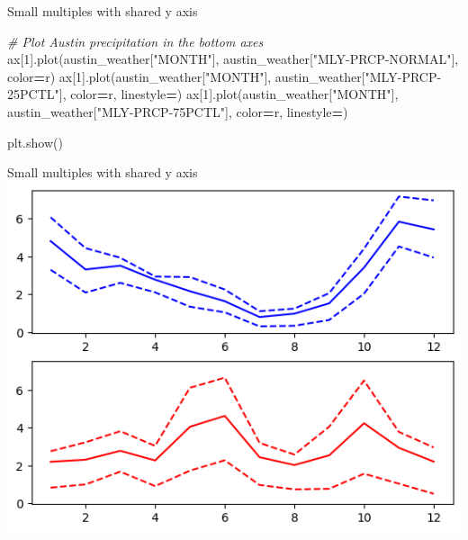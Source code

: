 \documentclass[
  ignorenonframetext,
]{beamer}
\newenvironment{Shaded}{\begin{snugshade}}{\end{snugshade}}
\newcommand{\CommentTok}[1]{\textcolor[rgb]{0.56,0.35,0.01}{\textit{#1}}}
\newcommand{\DecValTok}[1]{\textcolor[rgb]{0.00,0.00,0.81}{#1}}
\newcommand{\NormalTok}[1]{#1}
\newcommand{\OperatorTok}[1]{\textcolor[rgb]{0.81,0.36,0.00}{\textbf{#1}}}
\newcommand{\StringTok}[1]{\textcolor[rgb]{0.31,0.60,0.02}{#1}}
\begin{document}
\begin{frame}[fragile]{Small multiples with shared y axis}
\label{small-multiples-with-shared-y-axis-3}

\begin{Shaded}
\begin{Highlighting}[]
\CommentTok{\# Plot Austin precipitation in the bottom axes}
\NormalTok{ax[}\DecValTok{1}\NormalTok{].plot(austin\_weather[}\StringTok{"MONTH"}\NormalTok{], austin\_weather[}\StringTok{"MLY{-}PRCP{-}NORMAL"}\NormalTok{], color}\OperatorTok{=}\StringTok{\textquotesingle{}r\textquotesingle{}}\NormalTok{)}
\NormalTok{ax[}\DecValTok{1}\NormalTok{].plot(austin\_weather[}\StringTok{"MONTH"}\NormalTok{], austin\_weather[}\StringTok{"MLY{-}PRCP{-}25PCTL"}\NormalTok{], color}\OperatorTok{=}\StringTok{\textquotesingle{}r\textquotesingle{}}\NormalTok{, linestyle}\OperatorTok{=}\StringTok{\textquotesingle{}{-}{-}\textquotesingle{}}\NormalTok{)}
\NormalTok{ax[}\DecValTok{1}\NormalTok{].plot(austin\_weather[}\StringTok{"MONTH"}\NormalTok{], austin\_weather[}\StringTok{"MLY{-}PRCP{-}75PCTL"}\NormalTok{], color}\OperatorTok{=}\StringTok{\textquotesingle{}r\textquotesingle{}}\NormalTok{, linestyle}\OperatorTok{=}\StringTok{\textquotesingle{}{-}{-}\textquotesingle{}}\NormalTok{)}

\NormalTok{plt.show()}
\end{Highlighting}
\end{Shaded}
\end{frame}

\begin{frame}{Small multiples with shared y axis}
\label{small-multiples-with-shared-y-axis-4}
\includegraphics{../images/im232.png}
\end{frame}
\end{document}
